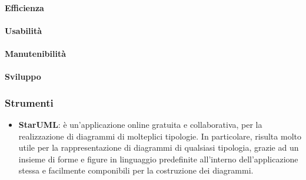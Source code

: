             \paragraph{Efficienza}
            \paragraph{Usabilità}
            \paragraph{Manutenibilità}
            \paragraph{Sviluppo}
\fi
    
        \subsubsection{Strumenti}
            \begin{itemize}
                \item\textbf{StarUML}: è un'applicazione online gratuita e collaborativa, per la realizzazione di diagrammi di molteplici tipologie. In particolare, risulta molto utile per la rappresentazione di diagrammi  di qualsiasi tipologia, grazie ad un insieme di forme e figure in linguaggio  predefinite all'interno dell'applicazione stessa e facilmente componibili per la costruzione dei diagrammi.
            \end{itemize}
            
            
            
            
            
            
            
            
            
            
            
            
            
            
            
\newpage        
                